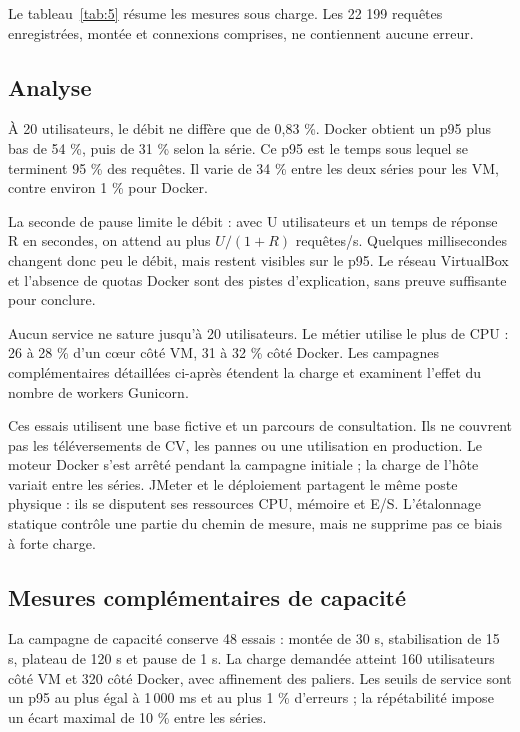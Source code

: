 \documentclass[a4paper,11pt]{article}
\begin{document}
Le tableau~\ref{tab:5} résume les mesures sous charge. Les 22 199 requêtes enregistrées, montée et connexions comprises, ne contiennent aucune erreur.

\subsection{Analyse}
À 20 utilisateurs, le débit ne diffère que de 0,83 \%. Docker obtient un p95 plus bas de 54 \%, puis de 31 \% selon la série. Ce p95 est le temps sous lequel se terminent 95 \% des requêtes. Il varie de 34 \% entre les deux séries pour les VM, contre environ 1 \% pour Docker.

La seconde de pause limite le débit : avec U utilisateurs et un temps de réponse R en secondes, on attend au plus $U/(1+R)$ requêtes/s. Quelques millisecondes changent donc peu le débit, mais restent visibles sur le p95. Le réseau VirtualBox et l'absence de quotas Docker sont des pistes d'explication, sans preuve suffisante pour conclure.

Aucun service ne sature jusqu'à 20 utilisateurs. Le métier utilise le plus de CPU : 26 à 28 \% d'un c\oe{}ur côté VM, 31 à 32 \% côté Docker. Les campagnes complémentaires détaillées ci-après étendent la charge et examinent l'effet du nombre de workers Gunicorn.

Ces essais utilisent une base fictive et un parcours de consultation. Ils ne couvrent pas les téléversements de CV, les pannes ou une utilisation en production. Le moteur Docker s'est arrêté pendant la campagne initiale ; la charge de l'hôte variait entre les séries. JMeter et le déploiement partagent le même poste physique : ils se disputent ses ressources CPU, mémoire et E/S. L'étalonnage statique contrôle une partie du chemin de mesure, mais ne supprime pas ce biais à forte charge.

\clearpage
\subsection{Mesures complémentaires de capacité}
La campagne de capacité conserve 48 essais : montée de 30 s, stabilisation de 15 s, plateau de 120 s et pause de 1 s. La charge demandée atteint 160 utilisateurs côté VM et 320 côté Docker, avec affinement des paliers. Les seuils de service sont un p95 au plus égal à 1\,000 ms et au plus 1 \% d'erreurs ; la répétabilité impose un écart maximal de 10 \% entre les séries.
\end{document}
